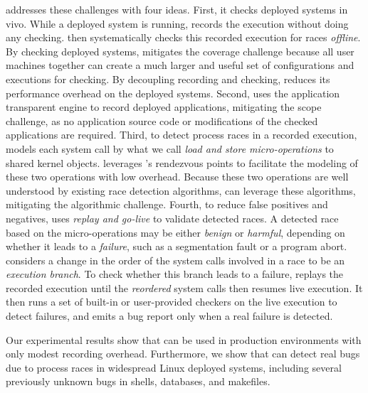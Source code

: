 \racepro addresses these challenges with four ideas.  First, it checks deployed
systems in vivo.  While a deployed system is running, \racepro records
the execution without doing any checking.  \racepro then systematically checks
this recorded execution for races \emph{offline}.  By checking deployed systems,
\racepro mitigates the coverage challenge because all user machines together can
create a much larger and useful set of configurations and executions for
checking.  By decoupling recording and checking, \racepro reduces its
performance overhead on the deployed systems.
Second, \racepro uses the application transparent \scribe engine to record
deployed applications, mitigating the scope challenge, as no application source
code or modifications of the checked applications are required.
Third, to detect process races in a recorded execution,
\racepro models each system call by what we call \emph{load and store
micro-operations} to shared kernel objects.  \racepro leverages \scribe's
rendezvous points to facilitate the modeling of these two operations with low
overhead.  Because these two operations are well understood by existing race
detection algorithms, \racepro can leverage these algorithms, mitigating the
algorithmic challenge.  Fourth, to reduce false positives and negatives,
\racepro uses \emph{replay and go-live} to validate detected races.  A
detected race based on the micro-operations may be either \emph{benign} or
\emph{harmful}, depending on whether it leads to a \emph{failure}, such as a
segmentation fault or a program abort.  \racepro considers a change in the order
of the system calls involved in a race to be an \emph{execution branch}.  To
check whether this branch leads to a failure, \racepro replays the recorded
execution until the \emph{reordered} system calls then resumes live execution.
It then runs a set of built-in or user-provided checkers on the live execution
to detect failures, and emits a bug report only when a real failure is detected.

Our experimental results show that \racepro can be used in production
environments with only modest recording overhead.  Furthermore, we show that
\racepro can detect real bugs due to process races in widespread Linux
deployed systems, including several previously unknown bugs in shells,
databases, and makefiles.


